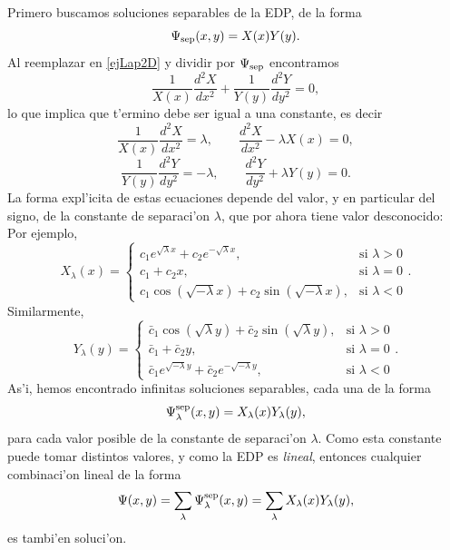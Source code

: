 Primero buscamos soluciones separables de la EDP, de la forma
\begin{equation}
\Psi_{\rm sep}(x,y)=X(x)Y(y).
\end{equation}
Al reemplazar en \eqref{ejLap2D} y dividir por $\Psi_{\rm sep}$ encontramos
\begin{equation}
\frac{1}{X(x)}\frac{d^2X}{dx^2}+\frac{1}{Y(y)}\frac{d^2Y}{dy^2} = 0,
\end{equation}
lo que implica que t'ermino debe ser igual a una constante, es decir
\begin{equation}
\frac{1}{X(x)}\frac{d^2X}{dx^2} = \lambda, \qquad \frac{d^2X}{dx^2}-\lambda X(x)=0,
\end{equation}
\begin{equation}
\frac{1}{Y(y)}\frac{d^2Y}{dy^2} = -\lambda, \qquad \frac{d^2Y}{dy^2}+\lambda Y(y)=0.
\end{equation}
La forma expl'icita de estas ecuaciones depende del valor, y en particular del signo, de la constante de separaci'on $\lambda$, que por ahora tiene valor desconocido: Por ejemplo,
\begin{equation}
X_\lambda(x)= 	\begin{cases}
		c_1e^{\sqrt{\lambda}x} + c_2e^{-\sqrt{\lambda}x}, & \text{si }\lambda>0 \\
		c_1 + c_2x,  & \text{si } \lambda=0 \\
		c_1\cos(\sqrt{-\lambda}x) + c_2\sin(\sqrt{-\lambda}x), & \text{si } \lambda<0
		\end{cases}.
\end{equation}
Similarmente,
\begin{equation}
Y_\lambda(y)= 	\begin{cases}
		\bar{c}_1\cos(\sqrt{\lambda}y) + \bar{c}_2\sin(\sqrt{\lambda}y), & \text{si }\lambda>0 \\
		\bar{c}_1 + \bar{c}_2y,  & \text{si } \lambda=0 \\
		\bar{c}_1e^{\sqrt{-\lambda}y} + \bar{c}_2e^{-\sqrt{-\lambda}y}, & \text{si } \lambda<0
		\end{cases}.
\end{equation}
As'i, hemos encontrado infinitas soluciones separables, cada una de la forma
\begin{equation}\label{EjLapPsiXY}
\Psi_\lambda^{\rm sep}(x,y)=X_\lambda(x)Y_\lambda(y),
\end{equation}
para cada valor posible de la constante de separaci'on $\lambda$. Como esta constante puede tomar distintos valores, y como la EDP es \textit{lineal}, entonces cualquier combinaci'on lineal de la forma
\begin{equation}\label{EjLapPsisumaSep}
\Psi(x,y) = \sum_{\lambda}\Psi_\lambda^{\rm sep}(x,y) = \sum_{\lambda}X_\lambda(x)Y_\lambda(y),
\end{equation}
es tambi'en soluci'on.

